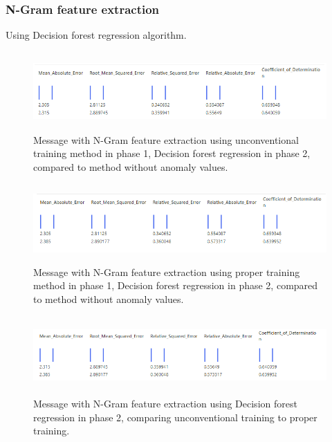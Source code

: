 

\clearpage


\subsubsection*{N-Gram feature extraction}
Using Decision forest regression algorithm.
\\
\begin{figure}[htb]
    \centering
    \includegraphics[height=30mm,scale=0.5]{./appendices/msg_ngram_decision-forest-reg_lewd2unanom.png}
    \caption{Message with N-Gram feature extraction
    using unconventional training method in phase 1,
        Decision forest regression in phase 2,
        compared to method without anomaly values.
        \label{fig:msg_ngram_decision-forest-reg_lewd2unanom}}
\end{figure}

\begin{figure}[htb]
    \centering
    \includegraphics[height=30mm,scale=0.5]{./appendices/msg_ngram_decision-forest-reg_proper2unanom.png}
    \caption{Message with N-Gram feature extraction
    using proper training method in phase 1,
        Decision forest regression in phase 2,
        compared to method without anomaly values.
        \label{fig:msg_ngram_decision-forest-reg_proper2unanom}}
\end{figure}

\begin{figure}[htb]
    \centering
    \includegraphics[height=30mm,scale=0.5]{./appendices/msg_ngram_decision-forest-reg_lewd2proper.png}
    \caption{Message with N-Gram feature extraction
    using Decision forest regression in phase 2,
        comparing unconventional training to proper training.
        \label{fig:msg_ngram_decision-forest-reg_lewd2proper}}
\end{figure}



